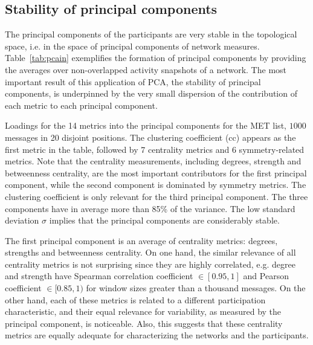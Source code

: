 \documentclass[%
aip,
jmp,%
amsmath,amssymb,
reprint,%
]{revtex4-1}
\begin{document}
\subsection{Stability of principal components}\label{prevalence}

The principal components of the participants are very stable in the topological space, i.e. in the space of principal components of network measures.
Table~\ref{tab:pcain} exemplifies the formation of principal components by providing the averages over non-overlapped activity snapshots of a network. The most important result of this application of PCA, the stability of principal components, is underpinned by the very small dispersion of the contribution of each metric to each principal component.

\begin{table}[!h]
\caption{Loadings for the 14 metrics into the principal components for the MET list, $1000$ messages in 20 disjoint positions. The clustering coefficient (cc) appears as the first metric in the table, followed by 7 centrality metrics and 6 symmetry-related metrics. Note that the centrality measurements, including degrees, strength and betweenness centrality, are the most important contributors for the first principal component, while the second component is dominated by symmetry metrics. The clustering coefficient is only relevant for the third principal component. The three components have in average more than 85\% of the variance.
The low standard deviation $\sigma$ implies that the principal components are considerably stable.}
\footnotesize

\label{tab:pcain}
\end{table}

The first principal component is an average of centrality metrics:
degrees, strengths and betweenness centrality.
On one hand, the similar relevance of all centrality metrics is not surprising since they are highly correlated,
e.g. degree and strength have Spearman correlation coefficient $\in [0.95,1]$ 
and Pearson coefficient $\in [0.85,1)$ for window sizes greater than a thousand messages.
On the other hand, each of these metrics is related to a different participation characteristic,
and their equal relevance for variability,
as measured by the principal component, is noticeable.
Also, this suggests that these centrality metrics 
are equally adequate for characterizing the networks
and the participants.
\end{document}
